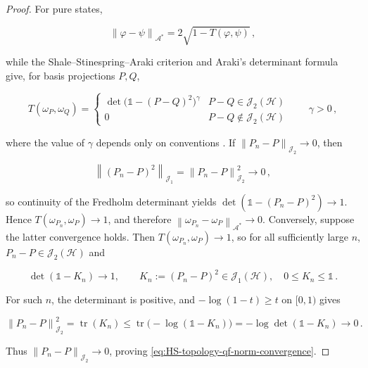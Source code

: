 \documentclass[a4paper,10pt]{article}
\numberwithin{equation}{section}
\theoremstyle{plain}
\theoremstyle{plain}
\theoremstyle{plain}
\theoremstyle{plain}
\theoremstyle{plain}
\theoremstyle{remark}
\theoremstyle{definition}
\newcommand{\calA}{\mathcal{A}}
\newcommand{\calN}{\mathcal{N}}
\newcommand{\calH}{\mathcal{H}}
\newcommand{\calJ}{\mathcal{J}}
\newcommand{\calP}{\mathcal{P}}
\newcommand\norm[1]{\left\lVert#1\right\rVert}
\newcommand{\tr}{\operatorname{tr}}
\newcommand{\Id}{\mathds{1}}
\begin{document}
\begin{proof}
For pure states,

$$
\norm{\varphi-\psi}_{\calA^*}
=2\sqrt{1-T(\varphi,\psi)}\, ,
$$

while the Shale--Stinespring--Araki criterion and Araki’s determinant formula give, for basis projections \(P,Q\),

$$
T(\omega_P,\omega_Q)=
\begin{cases}
\det\!\bigl(\Id-(P-Q)^2\bigr)^\gamma
& P-Q\in\calJ_2(\calH)\\
0&P-Q\notin\calJ_2(\calH)
\end{cases}
\qquad \gamma>0\, ,
$$

where the value of \(\gamma\) depends only on conventions
\cite{Araki1970QuasifreeCAR,PowersStormer1970FreeStates}. If
\(\norm{P_n-P}_{\calJ_2}\to0\), then

$$
\norm{(P_n-P)^2}_{\calJ_1}
=\norm{P_n-P}_{\calJ_2}^2\longrightarrow0\, ,
$$

so continuity of the Fredholm determinant yields
\(\det(\Id-(P_n-P)^2)\to1\). Hence
\(T(\omega_{P_n},\omega_P)\to1\), and therefore
\(\norm{\omega_{P_n}-\omega_P}_{\calA^*}\to0\). Conversely, suppose the latter convergence holds. Then \(T(\omega_{P_n},\omega_P)\to1\), so for all sufficiently large \(n\), \(P_n-P\in\calJ_2(\calH)\) and

$$
\det(\Id-K_n)\longrightarrow1,
\qquad K_n:=(P_n-P)^2\in\calJ_1(\calH),\quad 0\leq K_n\leq\Id\,.
$$

For such \(n\), the determinant is positive, and \(-\log(1-t)\geq t\) on \([0,1)\) gives

$$
\norm{P_n-P}_{\calJ_2}^2
=\tr(K_n)
\leq\tr\!\bigl(-\log(\Id-K_n)\bigr)
=-\log\det(\Id-K_n)
\longrightarrow0\,.
$$

Thus \(\norm{P_n-P}_{\calJ_2}\to0\), proving \cref{eq:HS-topology-qf-norm-convergence}.
\end{proof}



\end{document}
